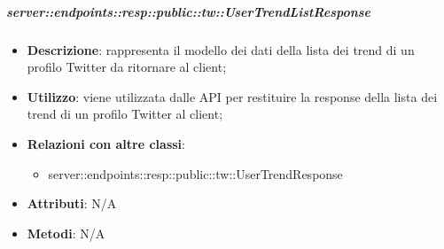 
    \subparagraph{server::endpoints::resp::public::tw::UserTrendListResponse} %
    \label{subp:bdsm_app_server_endpoints_resp_public_tw_usertrendlistresponse}
    \begin{itemize}
      \item \textbf{Descrizione}: rappresenta il modello dei dati della lista dei trend di un profilo Twitter da ritornare al client;
      \item \textbf{Utilizzo}: viene utilizzata dalle API per restituire la response della lista dei trend di un profilo Twitter al client;
      \item \textbf{Relazioni con altre classi}:
        \begin{itemize}
          \item server::endpoints::resp::public::tw::UserTrendResponse
        \end{itemize}
    \item \textbf{Attributi}: N/A
    \item \textbf{Metodi}: N/A
    \end{itemize}

